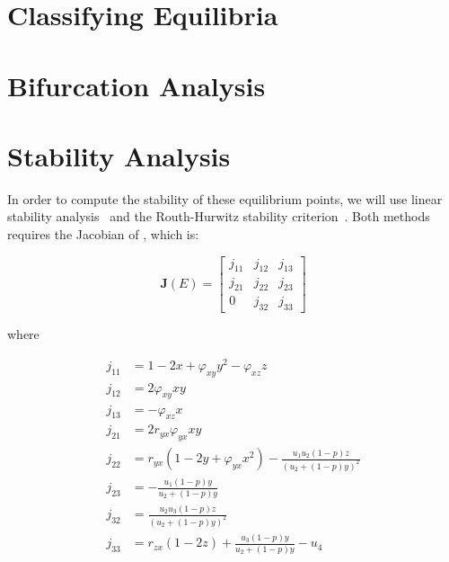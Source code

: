 \section{Classifying Equilibria}
\section{Bifurcation Analysis}
\section{Stability Analysis}
In order to compute the stability of these equilibrium points, we will use linear stability analysis~\cite{Strogatz9780813349107} and the Routh-Hurwitz stability criterion~\cite{YANG2002615621}. Both methods requires the Jacobian of , which is:

\begin{equation}\label{matrix:jacobian-model}
    \textbf{J}\left(E\right) = \begin{bmatrix}
        j_{11} & j_{12} & j_{13}\\
        j_{21} & j_{22} & j_{23}\\
        0 & j_{32} & j_{33}
    \end{bmatrix}
\end{equation}

where

\begin{align*}
    j_{11} &= 1-2x+\varphi_{xy}y^2-\varphi_{xz}z\\
    j_{12} &= 2\varphi_{xy}xy\\
    j_{13} &= -\varphi_{xz}x\\
    j_{21} &= 2r_{yx}\varphi_{yx}xy\\
    j_{22} &= r_{yx}\left(1-2y+\varphi_{yx}x^2\right)-\frac{u_1u_2\left(1-p\right)z}{\left(u_2+\left(1-p\right)y\right)^2}\\
    j_{23} &= -\frac{u_1\left(1-p\right)y}{u_2+\left(1-p\right)y}\\
    j_{32} &= \frac{u_2u_3\left(1-p\right)z}{\left(u_2+\left(1-p\right)y\right)^2}\\
    j_{33} &= r_{zx}\left(1-2z\right)+\frac{u_3\left(1-p\right)y}{u_2+\left(1-p\right)y}-u_4
\end{align*}

